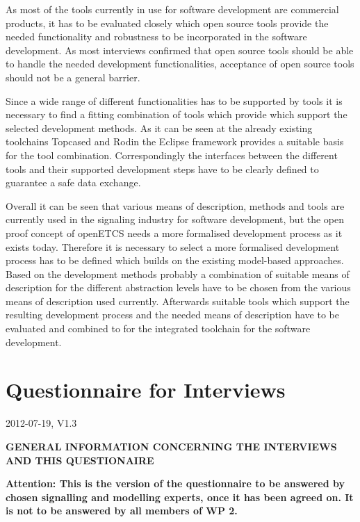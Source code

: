 \documentclass{./template/openetcs_report}
\begin{document}
As most of the tools currently in use for software development are commercial products, it has to be evaluated closely which open source tools provide the needed functionality and  robustness to be incorporated in the software development. As most interviews confirmed that open source tools should be able to handle the needed development functionalities, acceptance of open source tools should not be a general barrier. 

Since a wide range of different functionalities has to be supported by tools it is necessary to find a fitting combination of tools which provide which support the selected development methods. As it can be seen at the already existing toolchains Topcased and Rodin the Eclipse framework provides a suitable basis for the tool combination. Correspondingly the interfaces between the different tools and their supported development steps have to be clearly defined to guarantee a safe data exchange.

Overall it can be seen that various means of description, methods and tools are currently used in the signaling industry for software development, but the open proof concept of openETCS needs a more formalised development process as it exists today. Therefore it is necessary to select a more formalised  development process has to be defined which builds on the existing model-based approaches. Based on the development methods probably a combination of suitable means of description for the different abstraction levels have to be chosen from the various means of description used currently. Afterwards suitable tools which support the resulting development process and the needed means of description have to be evaluated and combined to for the integrated toolchain for the software development.

\appendix

\chapter{Questionnaire for Interviews}
\label{chap: questionnaire}

2012-07-19, V1.3 

\textbf{\Large GENERAL INFORMATION CONCERNING THE INTERVIEWS AND THIS QUESTIONAIRE}

\textbf {Attention: This is the version of the questionnaire to be answered by chosen signalling and modelling experts, once it has been agreed on. It is not to be answered by all members of WP 2.}
\end{document}
